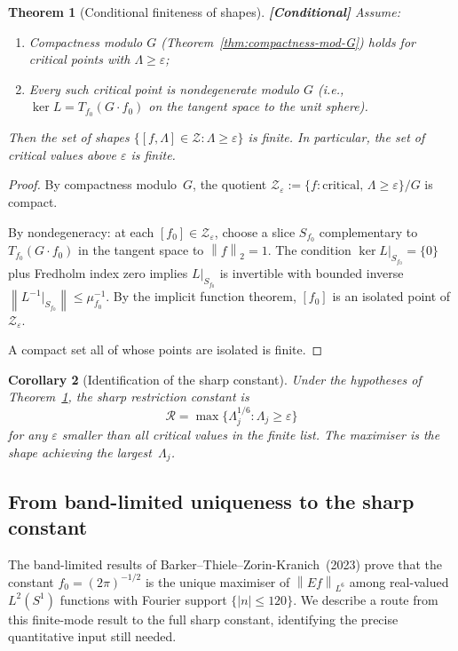 \documentclass[12pt]{article}
\newtheorem{theorem}{Theorem}[section]
\newtheorem{corollary}[theorem]{Corollary}
\theoremstyle{definition}
\theoremstyle{remark}
\newcommand{\norm}[1]{\left\|#1\right\|}
\newcommand{\conditional}{\textbf{\color{orange}[Conditional]}}
\begin{document}
\begin{theorem}[Conditional finiteness of shapes]
  \label{thm:finiteness}
  \conditional\quad
  Assume:
  \begin{enumerate}[leftmargin=2em]
    \item Compactness modulo $G$ (Theorem~\ref{thm:compactness-mod-G})
      holds for critical points with $\Lambda\geq\varepsilon$;
    \item Every such critical point is nondegenerate modulo $G$
      (i.e., $\ker L=T_{f_0}(G\cdot f_0)$ on the tangent space to the
      unit sphere).
  \end{enumerate}
  Then the set of shapes $\{[f,\Lambda]\in\mathcal Z:\Lambda\geq\varepsilon\}$
  is finite.  In particular, the set of critical values above $\varepsilon$
  is finite.
\end{theorem}

\begin{proof}
  By compactness modulo~$G$, the quotient
  $\mathcal Z_\varepsilon:=\{f:\text{critical},\,\Lambda\geq\varepsilon\}/G$
  is compact.

  By nondegeneracy: at each $[f_0]\in\mathcal Z_\varepsilon$, choose a slice
  $S_{f_0}$ complementary to $T_{f_0}(G\cdot f_0)$ in the tangent space
  to $\norm{f}_2=1$.  The condition $\ker L|_{S_{f_0}}=\{0\}$ plus
  Fredholm index zero implies $L|_{S_{f_0}}$ is invertible with bounded
  inverse $\norm{L^{-1}|_{S_{f_0}}}\leq\mu_{f_0}^{-1}$.  By the
  implicit function theorem, $[f_0]$ is an isolated point of
  $\mathcal Z_\varepsilon$.

  A compact set all of whose points are isolated is finite.
\end{proof}

\begin{corollary}[Identification of the sharp constant]
  Under the hypotheses of Theorem~\ref{thm:finiteness}, the sharp
  restriction constant is
  \[
    \mathcal R = \max\{\Lambda_j^{1/6}:\Lambda_j\geq\varepsilon\}
  \]
  for any $\varepsilon$ smaller than all critical values in the finite list.
  The maximiser is the shape achieving the largest~$\Lambda_j$.
\end{corollary}


\subsection{From band-limited uniqueness to the sharp constant}
\label{sec:btk-connection}

The band-limited results of Barker--Thiele--Zorin-Kranich~(2023) prove
that the constant $f_0=(2\pi)^{-1/2}$ is the unique maximiser of
$\norm{Ef}_{L^6}$ among real-valued $L^2(S^1)$ functions with Fourier
support $\{|n|\leq 120\}$.  We describe a route from this finite-mode
result to the full sharp constant, identifying the precise quantitative
input still needed.
\end{document}
